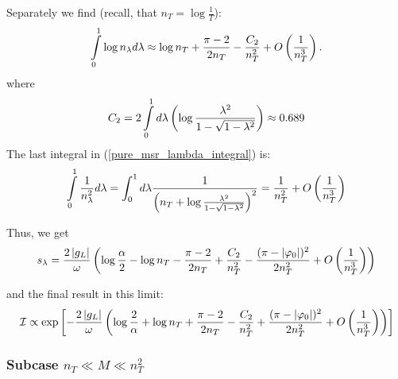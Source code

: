 Separately we find (recall, that $ n_T=\log\frac{1}{T} $):
\begin{gather}
	\intop_{0}^{1}\log n_{\lambda}d\lambda
	\approx
	\log n_T
	+
	\frac{\pi-2}{2n_T}
	-
	\frac{C_2}{n_T^2}
	+
	O
	\br{\frac{1}{n_T^3}}
	.
\end{gather}
where
\begin{gather}
	C_2
	=
	2\int\limits^1_0
	d\lambda
	\left(
	\log
		\frac{\lambda^2}{1-\sqrt{1-\lambda^2}}\right)
\approx
0.689
\end{gather}
The last integral in (\ref{pure_msr_lambda_integral}) is:
\begin{gather}
\intop_{0}^{1}\frac{1}{n_{\lambda}^{2}}d\lambda
=
\int_0^1 d\lambda
\frac{1}
{\br{n_T+\log\frac{\lambda^2}{1-\sqrt{1-\lambda^2}}}^2}
=
\frac{1}{n_T^2}
+
O\br{\frac{1}{n_T^3}}
\end{gather}


Thus, we get 
\begin{gather}
s_{\lambda}
=
\frac{2\left|g_L\right|}{\omega}
\left(\log\frac{\alpha}{2}
-
\log n_T
-
\frac{\pi-2}{2n_T}
+
\frac{C_2}{n_T^2}
-
\frac{(\pi-|\varphi_{0}|)^{2}}
{2n_T^{2}}
+
O\left(\frac{1}{n_T^{3}}\right)\right)
\end{gather}

and the final result in this limit:
\begin{gather}
\label{final_ion_pure_mar_1}
	\mathcal{I}
	\propto
	\exp
	\left[
	-
\frac{2\left|g_L\right|}{\omega}\left(
	\log\frac{2}{\alpha}
	+
	\log n_T
	+
	\frac{\pi-2}{2n_T}
	-
	\frac{C_2}{n_T^2}
	+
	\frac{(\pi-|\varphi_{0}|)^{2}}
	{2n_T^{2}}
	+
	O\left(\frac{1}{n_T^{3}}\right)\right)	
\right]
\end{gather}



\subsubsection{Subcase $ n_T\ll M \ll n_T^2  $}


